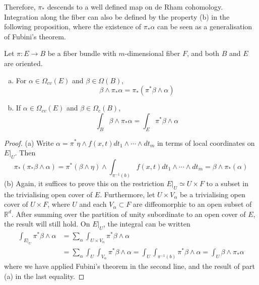 Therefore, $\pi_*$ descends to a well defined map on de Rham cohomology. 
Integration along the fiber can also be defined by the property (b) in the
following proposition, where the existence of $\pi_*\alpha$ can be seen as a 
generalisation of Fubini's theorem.
\begin{prop} %
	\label{prop:projection_formula}
	Let $\pi : E \to B$ be a fiber bundle with  $m$-dimensional fiber $F$, and
	both $B$ and  $E$ are oriented. 
	\begin{enumerate}[(a), leftmargin=\parindent]
	    \item For $\alpha\in \Omega_{cv}(E)$ and $\beta\in\Omega(B)$, 
	\[
		\beta\wedge \pi_*\alpha = \pi_*(\pi^*\beta\wedge\alpha)  
	\] 
		\item If $\alpha \in \Omega_{cv}(E)$ and $\beta\in \Omega_{c}(B)$,
			\[
			\int_B \beta\wedge \pi_*\alpha =  \int_E \pi^*\beta\wedge\alpha
			\] 
	\end{enumerate}
\end{prop}
\begin{proof}
	(a) Write $\alpha = \pi^*\eta \wedge f(x,t) dt_1\wedge\cdots\wedge dt_m $
	in terms of local coordinates on $E|_U$. Then 
	\[
	\pi_*(\pi_*\beta\wedge \alpha)
	=\pi^*(\beta\wedge\eta)\wedge \int_{\pi^{-1}(b)}f(x,t) 
	dt_1\wedge\cdots\wedge dt_m 	
	= \beta\wedge\pi_*(\alpha)
	\] 
	(b) Again, it suffices to prove this on the restriction $E|_U\simeq U\times F$ to a
	subset in the trivialising open cover of $E$. Furthermore,
	let $U\times V_\alpha$ be a trivialising open cover of $U\times F$, 
	where $U$ and each $V_{\alpha}\subset F$ are diffeomorphic to an open subset of
	$\mathbb{R}^d$. After summing over the partition of unity
	subordinate to an open cover of $E$, 
	the result will still hold. On $E|_U$, the integral can be written
	\begin{align*}
		\int_{E|_U} \pi^*\beta\wedge \alpha
		&= \sum_\alpha\int_{U \times V_\alpha}\pi^*\beta\wedge \alpha \\
		&= \sum_\alpha\int_{U}\int_{V_\alpha}\pi^*\beta\wedge \alpha
		= \int_{U}\int_{\pi^{-1}(b)}\pi^*\beta\wedge \alpha
		= \int_{U}\beta\wedge \pi_*\alpha 
	\end{align*}
	where we have applied Fubini's theorem in the second line, and the result of
	part (a) in the last equality.
\end{proof}


